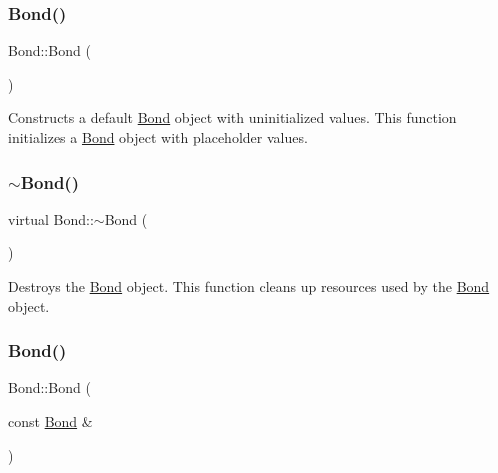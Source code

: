 \subsubsection{\texorpdfstring{Bond()}{Bond()}\hspace{0.1cm}{\footnotesize\ttfamily [3/4]}}
{\footnotesize\ttfamily Bond\+::\+Bond (\begin{DoxyParamCaption}{ }\end{DoxyParamCaption})}



Constructs a default \mbox{\hyperlink{classBond}{Bond}} object with uninitialized values. This function initializes a \mbox{\hyperlink{classBond}{Bond}} object with placeholder values. 

\mbox{\label{classBond_acd301f8d3b4f29e1f797f98d3a2a0b80}} 
\subsubsection{\texorpdfstring{$\sim$\+Bond()}{~Bond()}}
{\footnotesize\ttfamily virtual Bond\+::$\sim$\+Bond (\begin{DoxyParamCaption}{ }\end{DoxyParamCaption})\hspace{0.3cm}{\ttfamily [virtual]}}



Destroys the \mbox{\hyperlink{classBond}{Bond}} object. This function cleans up resources used by the \mbox{\hyperlink{classBond}{Bond}} object. 

\mbox{\label{classBond_acaa8874ed5e81057eeb7dc55fb6b5373}} 
\subsubsection{\texorpdfstring{Bond()}{Bond()}\hspace{0.1cm}{\footnotesize\ttfamily [4/4]}}
{\footnotesize\ttfamily Bond\+::\+Bond (\begin{DoxyParamCaption}\item[{const \mbox{\hyperlink{classBond}{Bond}} \&}]{ }\end{DoxyParamCaption})\hspace{0.3cm}{\ttfamily [default]}}



